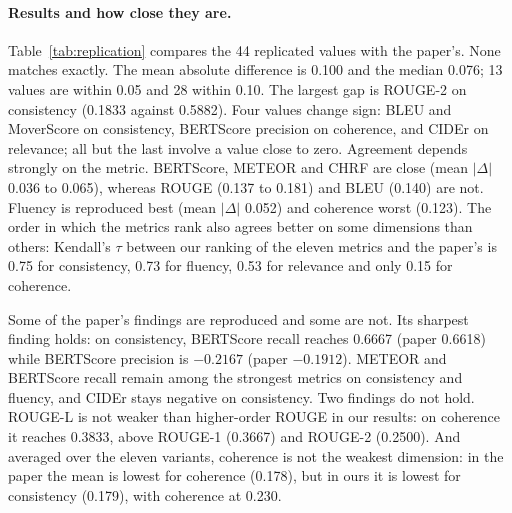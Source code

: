 \documentclass[11pt]{article}
\begin{document}
\paragraph{Results and how close they are.}
Table~\ref{tab:replication} compares the 44 replicated values with the paper's. None matches exactly. The mean absolute difference is 0.100 and the median 0.076; 13 values are within 0.05 and 28 within 0.10. The largest gap is ROUGE-2 on consistency (0.1833 against 0.5882). Four values change sign: BLEU and MoverScore on consistency, BERTScore precision on coherence, and CIDEr on relevance; all but the last involve a value close to zero. Agreement depends strongly on the metric. BERTScore, METEOR and CHRF are close (mean $|\Delta|$ 0.036 to 0.065), whereas ROUGE (0.137 to 0.181) and BLEU (0.140) are not. Fluency is reproduced best (mean $|\Delta|$ 0.052) and coherence worst (0.123). The order in which the metrics rank also agrees better on some dimensions than others: Kendall's $\tau$ between our ranking of the eleven metrics and the paper's is 0.75 for consistency, 0.73 for fluency, 0.53 for relevance and only 0.15 for coherence.

Some of the paper's findings are reproduced and some are not. Its sharpest finding holds: on consistency, BERTScore recall reaches 0.6667 (paper 0.6618) while BERTScore precision is $-0.2167$ (paper $-0.1912$). METEOR and BERTScore recall remain among the strongest metrics on consistency and fluency, and CIDEr stays negative on consistency. Two findings do not hold. ROUGE-L is not weaker than higher-order ROUGE in our results: on coherence it reaches 0.3833, above ROUGE-1 (0.3667) and ROUGE-2 (0.2500). And averaged over the eleven variants, coherence is not the weakest dimension: in the paper the mean is lowest for coherence (0.178), but in ours it is lowest for consistency (0.179), with coherence at 0.230.
\end{document}
